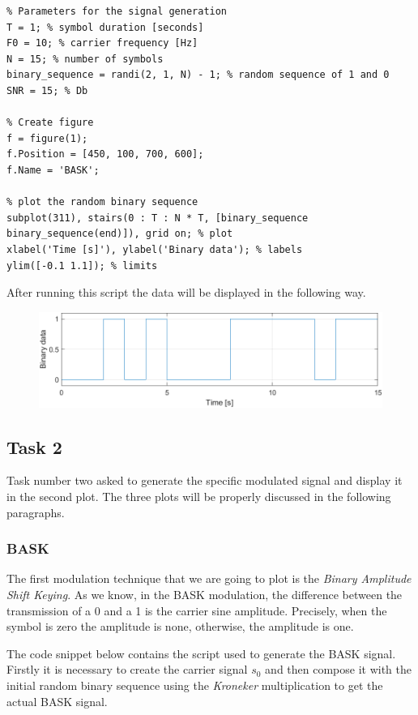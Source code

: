 \begin{lstlisting}
% Parameters for the signal generation 
T = 1; % symbol duration [seconds]
F0 = 10; % carrier frequency [Hz]
N = 15; % number of symbols
binary_sequence = randi(2, 1, N) - 1; % random sequence of 1 and 0
SNR = 15; % Db

% Create figure
f = figure(1);
f.Position = [450, 100, 700, 600];
f.Name = 'BASK';

% plot the random binary sequence
subplot(311), stairs(0 : T : N * T, [binary_sequence binary_sequence(end)]), grid on; % plot
xlabel('Time [s]'), ylabel('Binary data'); % labels
ylim([-0.1 1.1]); % limits
\end{lstlisting}

\noindent After running this script the data will be displayed in the following way.

\begin{figure}[!h]
    \centering
    \includegraphics[width = .7\textwidth]{lab-3/imgs/task1.png}
\end{figure}


\subsection*{Task 2}
Task number two asked to generate the specific modulated signal and display it in the second plot. The three plots will be properly discussed in the following paragraphs.

\subsubsection*{BASK}
The first modulation technique that we are going to plot is the \textsl{Binary Amplitude Shift Keying}. As we know, in the BASK modulation, the difference between the transmission of a 0 and a 1 is the carrier sine amplitude. Precisely, when the symbol is zero the amplitude is none, otherwise, the amplitude is one.

The code snippet below contains the script used to generate the BASK signal. Firstly it is necessary to create the carrier signal $s_0$ and then compose it with the initial random binary sequence using the \textsl{Kroneker} multiplication to get the actual BASK signal.

